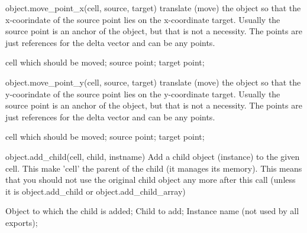 \begin{APIfunc}{object.move\_point\_x(cell, source, target)}
    translate (move) the object so that the x-coorindate of the source point lies on the x-coordinate target. Usually the source point is an anchor of the object, but that is not a necessity. The points are just references for the delta vector and can be any points.
    \begin{APIparameters}
            cell which should be moved;
            source point;
            target point;
    \end{APIparameters}
\end{APIfunc}
\begin{APIfunc}{object.move\_point\_y(cell, source, target)}
    translate (move) the object so that the y-coorindate of the source point lies on the y-coordinate target. Usually the source point is an anchor of the object, but that is not a necessity. The points are just references for the delta vector and can be any points.
    \begin{APIparameters}
            cell which should be moved;
            source point;
            target point;
    \end{APIparameters}
\end{APIfunc}
\begin{APIfunc}{object.add\_child(cell, child, instname)}
    Add a child object (instance) to the given cell. This make 'cell' the parent of the child (it manages its memory). This means that you should not use the original child object any more after this call (unless it is object.add\_child or object.add\_child\_array)
    \begin{APIparameters}
            Object to which the child is added;
            Child to add;
            Instance name (not used by all exports);
    \end{APIparameters}
\end{APIfunc}
